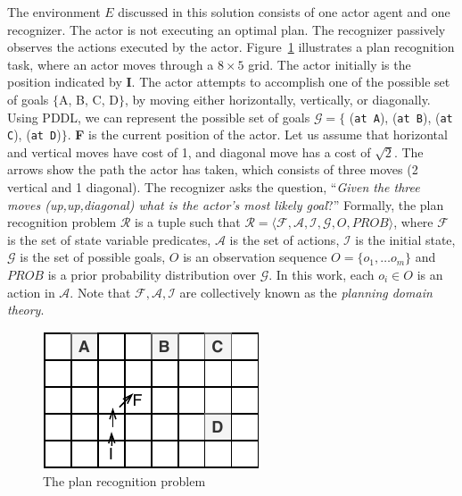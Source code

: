 The environment $E$ discussed in this solution consists of one actor agent and one recognizer. The actor is not executing an optimal plan. The recognizer passively observes the actions executed by the actor. Figure~\ref{fig:prp} illustrates a plan recognition task, where an actor moves through a $8\times5$ grid. The actor initially is the position indicated by \textbf{I}. The actor attempts to accomplish one of the possible set of goals $\lbrace$A, B, C, D$\rbrace$, by moving either horizontally, vertically, or diagonally. Using PDDL, we can represent the possible set of goals $\mathcal{G}=\lbrace$ (\texttt{at A}), (\texttt{at B}), (\texttt{at C}), (\texttt{at D})$\rbrace$. \textbf{F} is the current position of the actor. Let us assume that horizontal and vertical moves have cost of 1, and diagonal move has a cost of $\sqrt{2}$. The arrows show the path the actor has taken, which consists of three moves (2 vertical and 1 diagonal). The recognizer asks the question, ``\textit{Given the three moves (up,up,diagonal) what is the actor's most likely goal}?'' Formally, the plan recognition problem $\mathcal{R}$ is a tuple such that $\mathcal{R}=\langle \mathcal{F}, \mathcal{A}, \mathcal{I}, \mathcal{G}, O, PROB\rangle$, where $\mathcal{F}$ is the set of state variable predicates, $\mathcal{A}$ is the set of actions, $\mathcal{I}$ is the initial state, $\mathcal{G}$ is the set of possible goals, $O$ is an observation sequence $O=\lbrace o_1,\ldots o_m\rbrace$ and $PROB$ is a prior probability distribution over $\mathcal{G}$. In this work, each $o_i\in O$ is an action in $\mathcal{A}$.
Note that $\mathcal{F}, \mathcal{A}, \mathcal{I}$ are collectively known as the \textit{planning domain theory}.

\begin{figure}[!ht]
  \centering
\includegraphics[width=0.5\columnwidth]{img/rg.pdf}
  \caption{The plan recognition problem}
  \label{fig:prp}
\end{figure}


